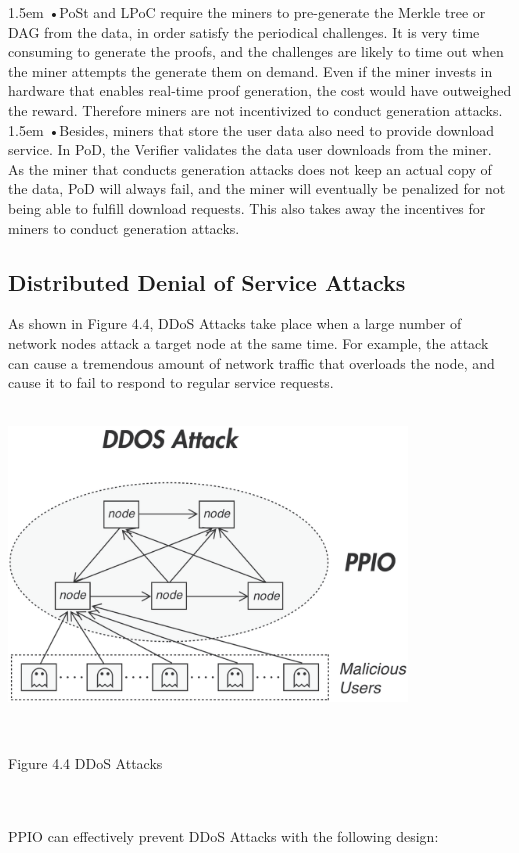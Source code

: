 \documentclass[10pt,a4paper]{article}
\begin{document}
\hangindent 1.5em
\noindent   
•\quad PoSt and LPoC require the miners to pre-generate the Merkle tree or DAG from the data, in order satisfy the periodical challenges. It is very time consuming to generate the proofs, and the challenges are likely to time out when the miner attempts the generate them on demand. Even if the miner invests in hardware that enables real-time proof generation, the cost would have outweighed the reward. Therefore miners are not incentivized to conduct generation attacks.
   \vspace{-0.8em}
\\

\hangindent 1.5em
\noindent   
•\quad Besides, miners that store the user data also need to provide download service. In PoD, the Verifier validates the data user downloads from the miner. As the miner that conducts generation attacks does not keep an actual copy of the data, PoD will always fail, and the miner will eventually be penalized for not being able to fulfill download requests. This also takes away the incentives for miners to conduct generation attacks.
   \vspace{-0.5em}


      \subsection{Distributed Denial of Service Attacks}  %
As shown in Figure 4.4, DDoS Attacks take place when a large number of network nodes attack a target node at the same time. For example, the attack can cause a tremendous amount of network traffic that overloads the node, and cause it to fail to respond to regular service requests.
   \vspace{-0.5em}
\\\\
\centerline{\includegraphics[width=300pt]{fig18}}
 \\ \centerline{{Figure 4.4 DDoS Attacks}}
    \vspace{-1.5em}
\\\\
PPIO can effectively prevent DDoS Attacks with the following design:
   \vspace{-0.8em}
\\
\end{document}
